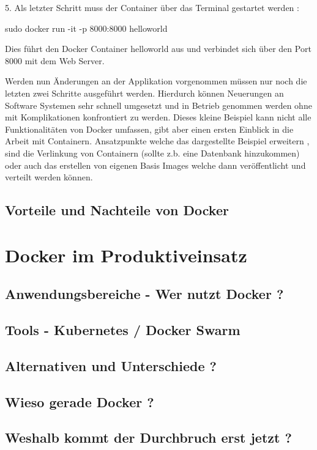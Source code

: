 \documentclass[12pt,toc=bib,toc=listof]{scrreprt}
\begin{document}
5. Als letzter Schritt muss der Container über das Terminal gestartet werden :

sudo docker run -it -p 8000:8000 helloworld

Dies führt den Docker Container helloworld aus und verbindet sich über den Port 8000 mit dem Web Server.

Werden nun Änderungen an der Applikation vorgenommen müssen nur noch die letzten zwei Schritte ausgeführt werden.
Hierdurch können Neuerungen an Software Systemen sehr schnell umgesetzt und in Betrieb genommen werden ohne mit Komplikationen konfrontiert zu werden.
Dieses kleine Beispiel kann nicht alle Funktionalitäten von Docker umfassen, gibt aber einen ersten Einblick in die Arbeit mit Containern.
Ansatzpunkte welche das dargestellte Beispiel erweitern , sind die Verlinkung von Containern (sollte z.b. eine Datenbank hinzukommen) oder auch das erstellen von eigenen Basis Images welche dann veröffentlicht und verteilt werden können.

\section{Vorteile und Nachteile von Docker}


\chapter{Docker im Produktiveinsatz}

\section{Anwendungsbereiche - Wer nutzt Docker ?}

\section{Tools - Kubernetes / Docker Swarm}


\section{Alternativen und Unterschiede ?}

\section{Wieso gerade Docker ?}

\section{Weshalb kommt der Durchbruch erst jetzt ?}
\end{document}
